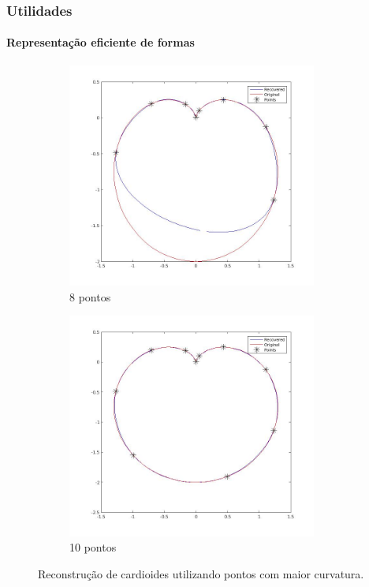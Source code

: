 \begin{frame}
	\frametitle{Utilidades}
	\framesubtitle{Representação eficiente de formas}
	\begin{figure}
		\centering
		\begin{subfigure}[b]{0.49\textwidth}
			\centering
			\includegraphics[width=0.9\textwidth]{img/card_curv8.jpg}
			\caption{8 pontos}
			\label{fig:carc8}
		\end{subfigure}
		\hfill
		\begin{subfigure}[b]{0.49\textwidth}
			\centering
			\includegraphics[width=0.9\textwidth]{img/card_curv10.jpg}
			\caption{10 pontos}
			\label{fig:carc10}
		\end{subfigure}
		\caption{Reconstrução de cardioides utilizando pontos com maior curvatura.}
	\end{figure}
\end{frame}

